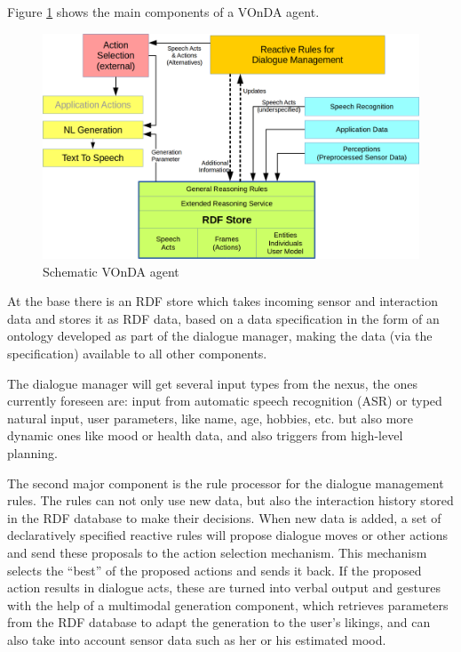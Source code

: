 \documentclass[a4paper]{report}
\newcommand{\vonda}{VOnDA\xspace}
\begin{document}
Figure \ref{fig:arch} shows the main components of a \vonda agent.


\begin{figure}[htb]
\includegraphics[width=.9\textwidth]{rudimant.png}
\caption{\label{fig:arch}Schematic \vonda agent}
\end{figure}

At the base there is an RDF store which takes incoming sensor and interaction
data and stores it as RDF data, based on a data specification in the form of
an ontology developed as part of the dialogue manager, making the data (via the
specification) available to all other components.

The dialogue manager will get several input types from the nexus, the ones
currently foreseen are: input from automatic speech recognition (ASR) or typed
natural input, user parameters, like name, age, hobbies, etc. but also more
dynamic ones like mood or health data, and also triggers from high-level
planning.

The second major component is the rule processor for the dialogue management
rules. The rules can not only use new data, but also the interaction history
stored in the RDF database to make their decisions.  When new data is added, a
set of declaratively specified reactive rules will propose dialogue moves or
other actions and send these proposals to the action selection mechanism. This mechanism selects the ``best'' of the proposed actions and sends it
back. If the proposed action results in dialogue acts, these are turned into
verbal output and gestures with the help of a multimodal generation component, 
which retrieves parameters from the RDF database to adapt the generation to the
user's likings, and can also take into account sensor data such as her or his
estimated mood.
\end{document}
